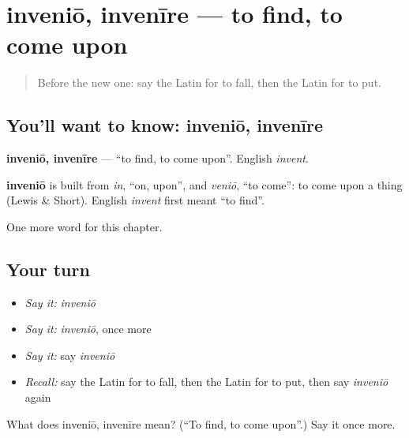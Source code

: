 \section[inveniō, invenīre]{inveniō, invenīre — to find, to come upon}

\label{lesson:LA-C77-invenio}



\begin{quote}
Before the new one: say the Latin for to fall, then the Latin for to put.
\end{quote}

\subsection*{You'll want to know: inveniō, invenīre}
\textbf{inveniō, invenīre} — \textquotedblleft{}to find, to come upon\textquotedblright{}. English \emph{invent}.

\begin{cousinweb}
\textbf{inveniō} is built from \emph{in}, \textquotedblleft{}on, upon\textquotedblright{}, and \emph{veniō}, \textquotedblleft{}to come\textquotedblright{}: to come upon a thing (Lewis \& Short). English \emph{invent} first meant \textquotedblleft{}to find\textquotedblright{}.
\end{cousinweb}

\begin{grammarlens}[title={What you've built}]
One more word for this chapter.
\end{grammarlens}

\subsection*{Your turn}
\begin{itemize}
\raggedright
  \item \emph{Say it:} \emph{inveniō}
  \item \emph{Say it:} \emph{inveniō}, once more
  \item \emph{Say it:} say \emph{inveniō}
  \item \emph{Recall:} say the Latin for to fall, then the Latin for to put, then say \emph{inveniō} again
\end{itemize}

\begin{tcolorbox}[breakable,colback=teal!4,colframe=teal!35!black,title={Before you move on}]
What does inveniō, invenīre mean? (\textquotedblleft{}To find, to come upon\textquotedblright{}.) Say it once more.
\end{tcolorbox}
